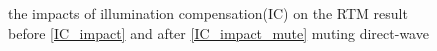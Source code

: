 \documentclass[a4paper]{article}
\begin{document}
	\begin{figure}[ht]

		\centering
		\caption{the impacts of illumination compensation(IC) on the RTM result before \ref{IC_impact} and after \ref{IC_impact_mute} muting direct-wave }
		\label{RTM_c}
	\end{figure}





	



\end{document}

